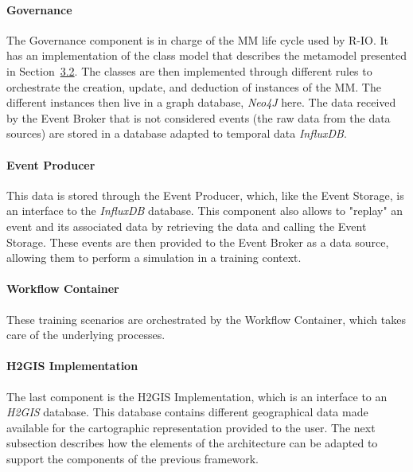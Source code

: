 \paragraph{Governance}
The Governance component is in charge of the MM life cycle used by R-IO.
It has an implementation of the class model that describes the metamodel presented in Section~\hyperref[sec:crisismetamodel]{3.2}.
The classes are then implemented through different rules to orchestrate the creation, update, and deduction of instances of the MM.
The different instances then live in a graph database, \textit{Neo4J} here.
The data received by the Event Broker that is not considered events (the raw data from the data sources) are stored in a database adapted to temporal data \textit{InfluxDB}.
\paragraph{Event Producer}
This data is stored through the Event Producer, which, like the Event Storage, is an interface to the \textit{InfluxDB} database.
This component also allows to "replay" an event and its associated data by retrieving the data and calling the Event Storage.
These events are then provided to the Event Broker as a data source, allowing them to perform a simulation in a training context.
\paragraph{Workflow Container}
These training scenarios are orchestrated by the Workflow Container, which takes care of the underlying processes.
\paragraph{H2GIS Implementation}
The last component is the H2GIS Implementation, which is an interface to an \textit{H2GIS} database.
This database contains different geographical data made available for the cartographic representation provided to the user.
The next subsection describes how the elements of the architecture can be adapted to support the components of the previous framework.

